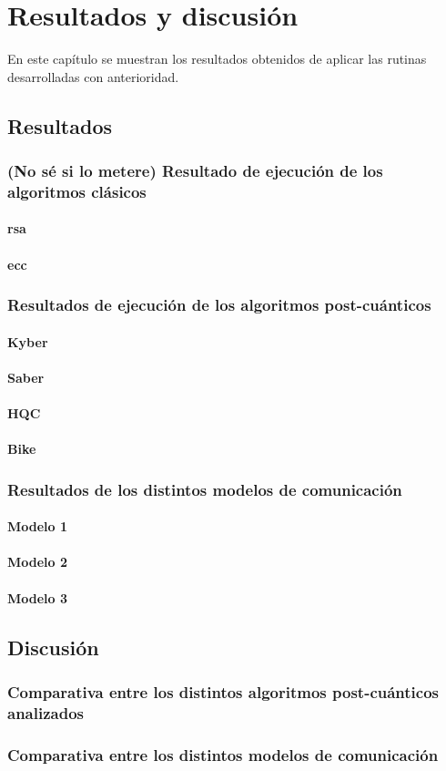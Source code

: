 \chapter{Resultados y discusión}

En este capítulo se muestran los resultados obtenidos de aplicar las rutinas desarrolladas con anterioridad.


\section{Resultados}
\subsection{(No sé si lo metere) Resultado de ejecución de los algoritmos clásicos}
\subsubsection{\gls{rsa}}
\subsubsection{\gls{ecc}}
\subsection{Resultados de ejecución de los algoritmos post-cuánticos}
\subsubsection{Kyber}
\subsubsection{Saber}
\subsubsection{HQC}
\subsubsection{Bike}
\subsection{Resultados de los distintos modelos de comunicación}
\subsubsection{Modelo 1}
\subsubsection{Modelo 2}
\subsubsection{Modelo 3}
\section{Discusión}
\subsection{Comparativa entre los distintos algoritmos post-cuánticos analizados}
\subsection{Comparativa entre los distintos modelos de comunicación}